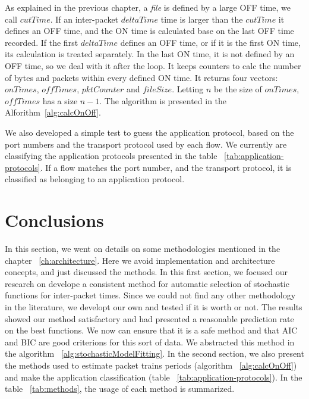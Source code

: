 As explained in the previous chapter, a \textit{file} is defined by a large OFF time, we call $cutTime$. If an inter-packet $deltaTime$ time is larger than the $cutTime$ it defines an OFF time, and the ON time is calculated base on the last OFF time recorded. 
If the first $deltaTime$ defines an OFF time, or if it is the first ON time, its calculation is treated separately. In the last ON time, it is not defined by an OFF time, so we deal with it after the loop. It keeps counters to calc the number of bytes and packets within every defined ON time. It returns four vectors: $onTimes$, $offTimes$, $pktCounter$ and $fileSize$. Letting $n$ be the size of $onTimes$,  $offTimes$ has a size $n - 1$. The algorithm is presented in the Alforithm~\ref{alg:calcOnOff}.



We also developed a simple test to guess the application protocol, based on the port numbers and the transport protocol used by each flow. We currently are classifying the application protocols presented in the table ~\ref{tab:application-protocols}. If a flow matches the port number, and the transport protocol, it is classified as belonging to an application protocol.

\section{Conclusions}

In this section, we went on details on some methodologies mentioned in the chapter ~\ref{ch:architecture}. Here we avoid implementation and architecture concepts, and just discussed the methods. In this first section, we focused our research on develope a consistent method for automatic selection of stochastic functions for inter-packet times. Since we could not find any other methodology in the literature, we developt our own and tested if it is worth or not. The results showed our method satisfactory and had presented a reasonable prediction rate on the best functions. We now can ensure that it is a safe method and that AIC and BIC are good criterions for this sort of data.  We abstracted this method in the algorithm ~\ref{alg:stochasticModelFitting}. In the second section, we also present the methods used to estimate packet trains periods (algorithm ~\ref{alg:calcOnOff}) and make the application classification (table ~\ref{tab:application-protocols}). In the table ~\ref{tab:methods}, the usage of each method is summarized. 

